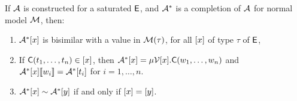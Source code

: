 \begin{lemma} 
\label{lem:model-completion}
If $\mathcal{A}$ is constructed for a saturated $\mathsf{E}$,
and $\mathcal{A}^\ast$ is a completion of $\mathcal{A}$ for normal model $\mathcal{M}$, then:
\begin{enumerate}
\item $\mathcal{A}^\ast [ x ]$ is bisimilar with a value in $\mathcal{M}( \tau )$, for all $[ x ]$ of type $\tau$ of $\mathsf{E}$,
\item
If $\textsf{C}( t_1, \ldots, t_n ) \in [ x ]$,
then $\mathcal{A}^\ast [ x ] = \mu \mathcal{V}{[ x ]}. \textsf{C}( w_1, \ldots, w_n )$
and $\mathcal{A}^\ast [ x ] [\![  w_i  ]\!] = \mathcal{A}^\ast [ t_i ]$ for $i = 1, \ldots, n$.
\item 
$\mathcal{A}^\ast [ x ] \sim \mathcal{A}^\ast [ y ]$ if and only if $[ x ] = [ y ]$.
\end{enumerate}
\end{lemma}
